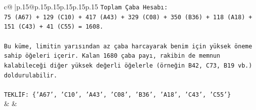 \documentclass{article}
\begin{document}
{\begin{supertabular}{c@{$\;$}|p{.15\linewidth}@{}p{.15\linewidth}p{.15\linewidth}p{.15\linewidth}p{.15\linewidth}p{.15\linewidth}}
{{{\texttt{Toplam Çaba Hesabı:} \\
\texttt{75 (A67) + 129 (C10) + 417 (A43) + 329 (C08) + 350 (B36) + 118 (A18) + 151 (C43) + 41 (C55) = 1608.} \\
\\ 
\texttt{Bu küme, limitin yarısından az çaba harcayarak benim için yüksek öneme sahip öğeleri içerir. Kalan 1680 çaba payı, rakibin de memnun kalabileceği diğer yüksek değerli öğelerle (örneğin B42, C73, B19 vb.) doldurulabilir.} \\
\\ 
\texttt{TEKLİF: \{'A67', 'C10', 'A43', 'C08', 'B36', 'A18', 'C43', 'C55'\}} \\
            }
        }
    }
    & & \\ \\


\end{supertabular}}
\end{document}
